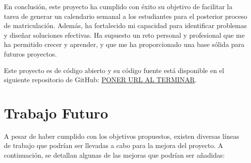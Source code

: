 En conclusión, este proyecto ha cumplido con éxito su objetivo de facilitar la tarea de generar un calendario semanal a los estudiantes para el posterior proceso de matriculación. Además, ha fortalecido mi capacidad para identificar problemas y diseñar soluciones efectivas. Ha supuesto un reto personal y profesional que me ha permitido crecer y aprender, y que me ha proporcionado una base sólida para futuros proyectos.\newline

Este proyecto es de código abierto y su código fuente está disponible en el siguiente repositorio de GitHub: \url{PONER URL AL TERMINAR}.

\section{Trabajo Futuro}

A pesar de haber cumplido con los objetivos propuestos, existen diversas líneas de trabajo que podrían ser llevadas a cabo para la mejora del proyecto. A continuación, se detallan algunas de las mejoras que podrían ser añadidas:

